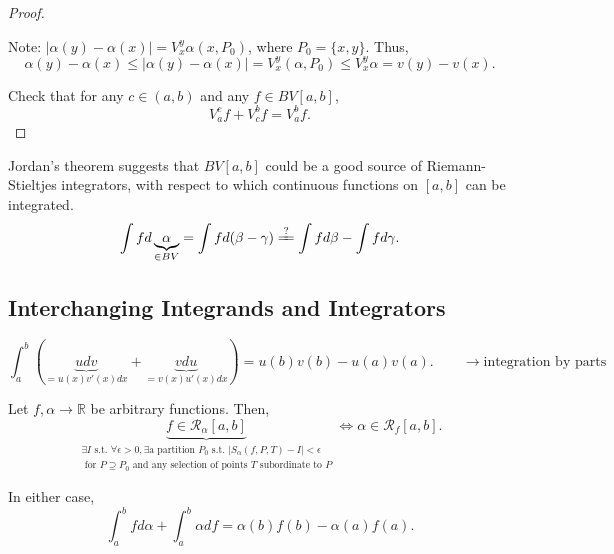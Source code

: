 \documentclass[letterpaper, reqno,11pt]{article}
\newcommand{\RR}{\mathbb{R}}
\begin{document}
\begin{proof}
  \begin{figure}[H]
    \centering
  \end{figure}

  Note: $|\alpha(y) - \alpha(x)| = V_x^y \alpha(x, P_0)$, where $P_0 = \{ x, y \}$. Thus,
  $$ \alpha(y) - \alpha(x) \leq |\alpha(y) - \alpha(x)| = V_x^y (\alpha, P_0) \leq V_x^y \alpha = v(y) - v(x). $$

  \medskip

   Check that for any $c \in (a, b)$ and any $f \in BV[a, b]$,
  $$ V_a^c f + V_c^b f = V_a^b f. $$
\end{proof}

\begin{remark}
  \normalfont Jordan's theorem suggests that $BV[a, b]$ could be a good source of Riemann-Stieltjes integrators, with respect to which continuous functions on $[a, b]$ can be integrated.
  $$ \int fd\underbrace{\alpha}_{\in BV} = \int fd(\beta - \gamma) \xlongequal{\text{?}} \int fd\beta - \int fd\gamma. $$
\end{remark}

\subsection{Interchanging Integrands and Integrators}

$$ \int_a^b (\underbrace{udv}_{=u(x)v'(x)dx} + \underbrace{vdu}_{=v(x)u'(x)dx}) = u(b) v(b) - u(a) v(a). \qquad \longrightarrow \text{integration by parts} $$

\begin{thm}
  \normalfont Let $f, \alpha \to \RR$ be arbitrary functions. Then,
  $$ \underbrace{f \in \mathcal R_\alpha[a, b]}_{\substack{\exists I \text{ s.t. } \forall \epsilon > 0, \exists \text{a partition $P_0$} \text{ s.t. } |S_\alpha(f, P, T) - I| < \epsilon \\ \text{ for $P \supseteq P_0$ and any selection of points $T$ subordinate to $P$}}} \Leftrightarrow \alpha \in \mathcal R_f[a, b]. $$

  In either case,
  $$ \int_a^b fd\alpha + \int_a^b \alpha df = \alpha(b) f(b) - \alpha(a) f(a). $$
\end{thm}
\end{document}
